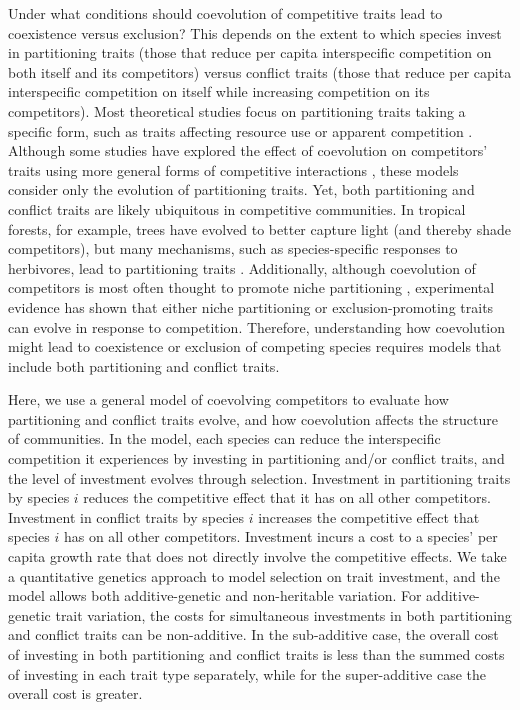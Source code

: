 Under what conditions should coevolution of competitive traits lead to
coexistence versus exclusion? This depends on the extent to which species 
invest in partitioning traits (those that reduce per capita interspecific
competition on both itself and its competitors) versus conflict traits
(those that reduce per capita interspecific competition on itself while
increasing competition on its competitors). Most theoretical studies focus 
on partitioning traits taking a specific form, such as traits affecting 
resource use
\citep[e.g.,][]{Roughgarden1976, Shoresh2008} or apparent
competition \citep[e.g.,][]{Abrams1998, Abrams2002, Schreiber2011}.
Although some studies have explored the effect of coevolution on 
competitors’ traits using more general forms of competitive 
interactions \citep[e.g.,][]{Abrams2013, Pastore2021}, these
models consider only the evolution of partitioning traits. Yet, both
partitioning and conflict traits are likely ubiquitous in competitive
communities. In tropical forests, for example, trees have evolved to
better capture light (and thereby shade competitors), but many
mechanisms, such as species-specific responses to herbivores, lead to
partitioning traits \citep{Wright2002}. Additionally, although coevolution of
competitors is most often thought to promote niche partitioning 
\citep{Pfennig2012}, experimental evidence has shown that either niche
partitioning \citep{Schluter1994, Zuppinger-Dingley2014} or
exclusion-promoting traits \citep{Germain2020, Hart2019, Miller2014, Zhao2016}
can evolve in response to competition. 
Therefore, understanding how coevolution might lead to coexistence or
exclusion of competing species requires models that include both
partitioning and conflict traits.

Here, we use a general model of coevolving competitors to evaluate how
partitioning and conflict traits evolve, and how coevolution affects the
structure of communities. In the model, each species can reduce the
interspecific competition it experiences by investing in partitioning
and/or conflict traits, and the level of investment evolves through
selection. Investment in partitioning traits by species $i$ reduces
the competitive effect that it has on all other competitors.
Investment in conflict traits by species $i$ increases the competitive
effect that species $i$ has on all other competitors. Investment
incurs a cost to a species' per capita growth rate that does not
directly involve the competitive effects. We take a quantitative
genetics approach to model selection on trait investment, and the model
allows both additive-genetic and non-heritable variation. For
additive-genetic trait variation, the costs for simultaneous investments
in both partitioning and conflict traits can be non-additive. In the
sub-additive case, the overall cost of investing in both partitioning
and conflict traits is less than the summed costs of investing in each
trait type separately, while for the super-additive case the overall
cost is greater.

